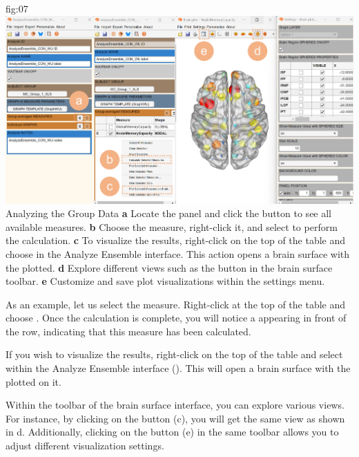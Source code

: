 \documentclass[justified]{tufte-handout}
\begin{document}
{fig:07}
{
	\includegraphics{fig07.jpg}
}
{Analyzing the Group Data}
{
	{\bf a} Locate the  panel and click the  button to see all available measures. 
	{\bf b} Choose the  measure, right-click it, and select  to perform the calculation.
	{\bf c} To visualize the results, right-click on the top of the table and choose  in the Analyze Ensemble interface. This action opens a brain surface with the  plotted.
	{\bf d} Explore different views such as the  button in the brain surface toolbar.
	{\bf e} Customize and save plot visualizations within the settings menu.
}


As an example, let us select the  measure. Right-click at the top of the table and choose . Once the calculation is complete, you will notice a  appearing in front of the  row, indicating that this measure has been calculated.

If you wish to visualize the results, right-click on the top of the table and select  within the Analyze Ensemble interface (). This will open a brain surface with the  plotted on it.

Within the toolbar of the brain surface interface, you can explore various views.
For instance, by clicking on the  button (c), you will get the same view as shown in d. Additionally, clicking on the  button (e) in the same toolbar allows you to adjust different visualization settings.
\end{document}
